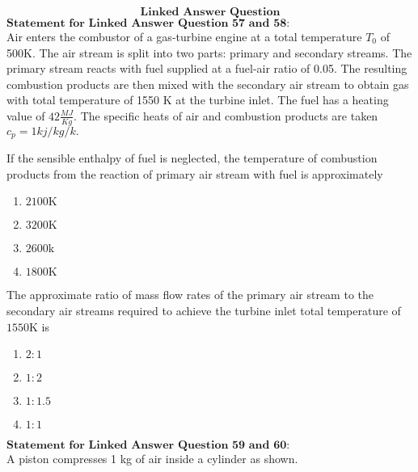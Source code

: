 \bigskip
$$\textbf{Linked Answer Question}$$
$\textbf{Statement for Linked Answer Question 57 and 58:}$\\
Air enters the combustor of a gas-turbine engine at a total temperature $T_{0}$ of 500K. The air stream is split into two parts: primary and secondary streams. The primary stream reacts with fuel supplied at a fuel-air ratio of 0.05. The resulting combustion products are then mixed with the secondary air stream to obtain gas with total temperature of 1550 K at the turbine inlet. The fuel has a heating value of $42 \frac{MJ}{Kg}.$ The specific heats of air and combustion products are taken $c_{p}=1kj/kg/k.$\bigskip
\item If the sensible enthalpy of fuel is neglected, the temperature of combustion products from the reaction of primary air stream with fuel is approximately
\begin{multicols}{4}
    \begin{enumerate}
        \item $2100\text{K}$
        \item $3200\text{K}$
        \item $2600\text{k}$
        \item $1800\text{K}$        
    \end{enumerate}
\end{multicols}    
\bigskip
\item The approximate ratio of mass flow rates of the primary air stream to the secondary air streams required to achieve the turbine inlet total temperature of $1550\text{K}$ is 
\begin{multicols}{4}
    \begin{enumerate}
        \item $2:1$
        \item $1:2$
        \item $1:1.5$
        \item $1:1$        
    \end{enumerate}
\end{multicols}    
\bigskip
$\textbf{Statement for Linked Answer Question 59 and 60:}$\\
A piston compresses 1 kg of air inside a cylinder as shown. 
\begin{figure}[H]
\centering
{}%

\label{fig:my_label}
\end{figure}
